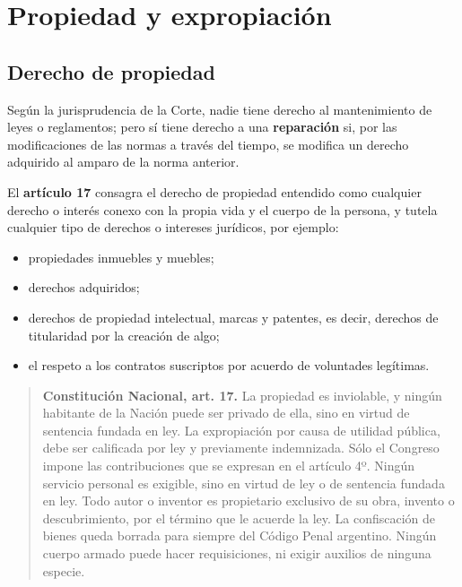\documentclass[12pt,oneside]{book}
\begin{document}
\chapter{Propiedad y expropiación}

\section{Derecho de propiedad}

Según la jurisprudencia de la Corte, nadie tiene derecho al mantenimiento de leyes o reglamentos; pero sí tiene derecho a una \textbf{reparación} si, por las modificaciones de las normas a través del tiempo, se modifica un derecho adquirido al amparo de la norma anterior.

El \textbf{artículo 17} consagra el derecho de propiedad entendido como cualquier derecho o interés conexo con la propia vida y el cuerpo de la persona, y tutela cualquier tipo de derechos o intereses jurídicos, por ejemplo:
\begin{itemize}
    \item propiedades inmuebles y muebles;
    \item derechos adquiridos;
    \item derechos de propiedad intelectual, marcas y patentes, es decir, derechos de titularidad por la creación de algo;
    \item el respeto a los contratos suscriptos por acuerdo de voluntades legítimas.
\end{itemize}

\begin{quote}
\textbf{Constitución Nacional, art. 17.} La propiedad es inviolable, y ningún habitante de la Nación puede ser privado de ella, sino en virtud de sentencia fundada en ley. La expropiación por causa de utilidad pública, debe ser calificada por ley y previamente indemnizada. Sólo el Congreso impone las contribuciones que se expresan en el artículo 4º. Ningún servicio personal es exigible, sino en virtud de ley o de sentencia fundada en ley. Todo autor o inventor es propietario exclusivo de su obra, invento o descubrimiento, por el término que le acuerde la ley. La confiscación de bienes queda borrada para siempre del Código Penal argentino. Ningún cuerpo armado puede hacer requisiciones, ni exigir auxilios de ninguna especie.
\end{quote}
\end{document}
